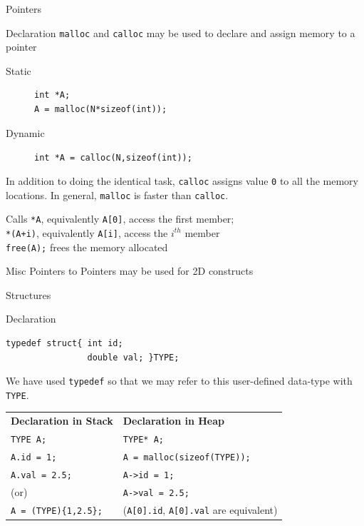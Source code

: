 \documentclass{beamer}
\begin{document}
\begin{frame}[fragile]{Pointers}
\begin{block}{Declaration}
\verb|malloc| and \verb|calloc| may be used to declare and assign memory to a pointer
\begin{description}
\item[Static] 
\begin{verbatim}
int *A;
A = malloc(N*sizeof(int));
\end{verbatim}
\item[Dynamic] \verb|int *A = calloc(N,sizeof(int));|
\end{description}
In addition to doing the identical task, \verb|calloc| assigns value \verb|0| to all the memory locations. In general, \verb|malloc| is faster than \verb|calloc|.
\end{block}
\begin{block}{Calls}
\verb|*A|, equivalently \verb|A[0]|, access the first member;\\
\verb|*(A+i)|, equivalently \verb|A[i]|, access the $i^{th}$ member\\
\verb|free(A);| frees the memory allocated
\end{block}
\begin{block}{Misc}
Pointers to Pointers may be used for 2D constructs
\end{block}
\end{frame}

\begin{frame}[fragile]{Structures}
\begin{block}{Declaration}
\begin{verbatim}
typedef struct{ int id;
                double val; }TYPE;
\end{verbatim}
We have used \verb|typedef| so that we may refer to this user-defined data-type with \verb|TYPE|.
\end{block}

\begin{center}
\begin{tabular}{ll}
\textbf{Declaration in Stack}&\textbf{Declaration in Heap}\\
\verb|TYPE A;|&\verb|TYPE* A;|\\
\verb|A.id = 1;|&\verb|A = malloc(sizeof(TYPE));|\\
\verb|A.val = 2.5;|&\verb|A->id = 1;|\\
(or)&\verb|A->val = 2.5;|\\
\verb|A = (TYPE){1,2.5};|&(\verb|A[0].id|, \verb|A[0].val| are equivalent)\\
\end{tabular}
\end{center}
\end{frame}
\end{document}
